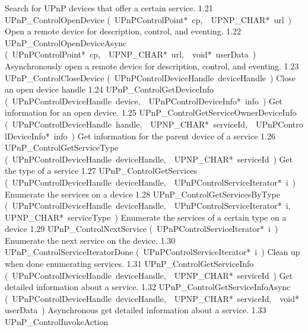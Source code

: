\documentclass{article}
\begin{document}
\begin{cxxentry}
\begin{cxxnames}
        {Search for UPnP devices that offer a certain service. }
        {1.21}
        {UPnP\_ControlOpenDevice}
        {(\ UPnPControlPoint*\ cp,\ \ UPNP\_CHAR*\ url\ )}
        {Open a remote device for description, control, and eventing. }
        {1.22}
        {UPnP\_ControlOpenDeviceAsync}
        {(\ UPnPControlPoint*\ cp,\ \ UPNP\_CHAR*\ url,\ \ void*\ userData\ )}
        {Asynchronously open a remote device for description, control, and eventing. }
        {1.23}
        {UPnP\_ControlCloseDevice}
        {(\ UPnPControlDeviceHandle\ deviceHandle\ )}
        {Close an open device handle }
        {1.24}
        {UPnP\_ControlGetDeviceInfo}
        {(\ UPnPControlDeviceHandle\ device,\ \ UPnPControlDeviceInfo*\ info\ )}
        {Get information for an open device. }
        {1.25}
        {UPnP\_ControlGetServiceOwnerDeviceInfo}
        {(\ UPnPControlDeviceHandle\ handle,\ \ UPNP\_CHAR*\ serviceId,\ \ UPnPControlDeviceInfo*\ info\ )}
        {Get information for the parent device of a service }
        {1.26}
        {UPnP\_ControlGetServiceType}
        {(\ UPnPControlDeviceHandle\ deviceHandle,\ \ UPNP\_CHAR*\ serviceId\ )}
        {Get the type of a service }
        {1.27}
        {UPnP\_ControlGetServices}
        {(\ UPnPControlDeviceHandle\ deviceHandle,\ \ UPnPControlServiceIterator*\ i\ )}
        {Enumerate the services on a device }
        {1.28}
        {UPnP\_ControlGetServicesByType}
        {(\ UPnPControlDeviceHandle\ deviceHandle,\ \ UPnPControlServiceIterator*\ i,\ \ UPNP\_CHAR*\ serviceType\ )}
        {Enumerate the services of a certain type on a device }
        {1.29}
        {UPnP\_ControlNextService}
        {(\ UPnPControlServiceIterator*\ i\ )}
        {Enumerate the next service on the device. }
        {1.30}
        {UPnP\_ControlServiceIteratorDone}
        {(\ UPnPControlServiceIterator*\ i\ )}
        {Clean up when done enumerating services. }
        {1.31}
        {UPnP\_ControlGetServiceInfo}
        {(\ UPnPControlDeviceHandle\ deviceHandle,\ \ UPNP\_CHAR*\ serviceId\ )}
        {Get detailed information about a service. }
        {1.32}
        {UPnP\_ControlGetServiceInfoAsync}
        {(\ UPnPControlDeviceHandle\ deviceHandle,\ \ UPNP\_CHAR*\ serviceId,\ \ void*\ userData\ )}
        {Asynchronous get detailed information about a service. }
        {1.33}
        {UPnP\_ControlInvokeAction}

\end{cxxnames}
\end{cxxentry}
\end{document}
